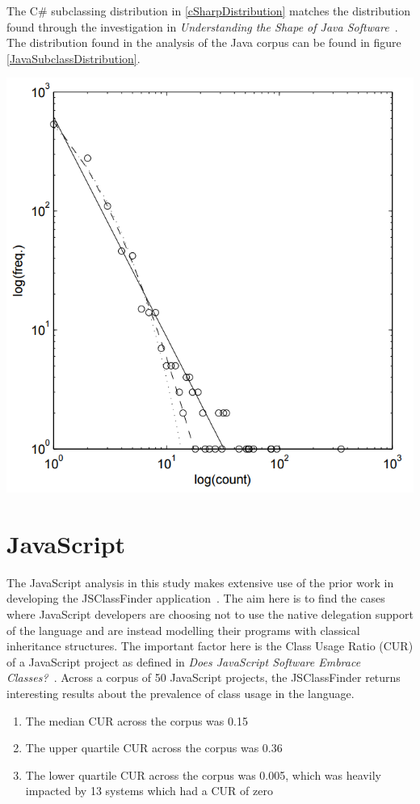 The C\# subclassing distribution in \ref{cSharpDistribution} matches the distribution found through the investigation in \textit{Understanding the Shape of Java Software}~\cite{ShapeOfJava}. The distribution found in the analysis of the Java corpus can be found in figure \ref{JavaSubclassDistribution}.

\begin{center}
	\label{JavaSubclassDistribution}
	\includegraphics[scale=0.50]{SubclassDistributionJava.png}
\end{center}

\section{JavaScript}

The JavaScript analysis in this study makes extensive use of the prior work in developing the JSClassFinder application~\cite{JSClassFinder}. The aim here is to find the cases where JavaScript developers are choosing not to use the native delegation support of the language and are instead modelling their programs with classical inheritance structures. The important factor here is the Class Usage Ratio (CUR) of a JavaScript project as defined in \textit{Does JavaScript Software Embrace Classes?~\cite{JSClassFinder}}. Across a corpus of 50 JavaScript projects, the JSClassFinder returns interesting results about the prevalence of class usage in the language.
\begin{enumerate}
	\item The median CUR across the corpus was 0.15
	\item The upper quartile CUR across the corpus was 0.36
	\item The lower quartile CUR across the corpus was 0.005, which was heavily impacted by 13 systems which had a CUR of zero
\end{enumerate}
